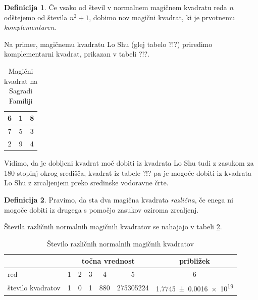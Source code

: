 \documentclass[a4paper,12pt]{article}
\theoremstyle{definition}
\newtheorem{definicija}{Definicija}
\theoremstyle{plain}
\begin{document}
\begin{definicija}
   Če vsako od števil v normalnem magičnem kvadratu reda \(n\) odštejemo
   od števila \(n^2+1\), dobimo nov magični kvadrat, ki je prvotnemu
   \emph{komplementaren}.
\end{definicija}

Na primer, magičnemu kvadratu Lo Shu (glej tabelo ?!?) priredimo
komplementarni kvadrat, prikazan v tabeli ?!?. %
%

\begin{table}
   \centering
   \caption{Magični kvadrat na Sagradi Famíliji}
   \label{table:sagrada}
   \begin{tabular}{|c|c|c|}
     \hline
       6 & 1 & 8 \\
      \hline
      7 & 5 & 3 \\
      \hline
      2 & 9 & 4 \\
    \hline 
   \end{tabular}  
\end{table}

Vidimo, da je dobljeni kvadrat moč dobiti iz kvadrata Lo Shu tudi z zasukom za
180 stopinj okrog središča, kvadrat iz tabele ?!? pa je mogoče dobiti
iz kvadrata Lo Shu z zrcaljenjem preko sredinske vodoravne črte. %

\begin{definicija}
   Pravimo, da sta dva magična kvadrata \emph{različna}, če enega ni mogoče dobiti
   iz drugega s pomočjo zasukov oziroma zrcaljenj.
\end{definicija}

Števila različnih normalnih magičnih kvadratov se nahajajo v tabeli \ref{table:stevila}.

\begin{table}[!ht]
   \centering
   \caption{Število različnih normalnih magičnih kvadratov}
   \label{table:stevila}
   \begin{tabular}{lcccccc}\toprule
      & \multicolumn{5}{c}{točna vrednost} & približek \\
      \midrule
      red & 1 & 2 & 3 & 4 & 5 & 6 \\
      število kvadratov & 1 & 0 & 1 & 880 & \num{275305224} & \num[separate-uncertainty]{1.7745 \pm 0.0016 e19} \\
      \bottomrule
   \end{tabular}
\end{table}
\end{document}
